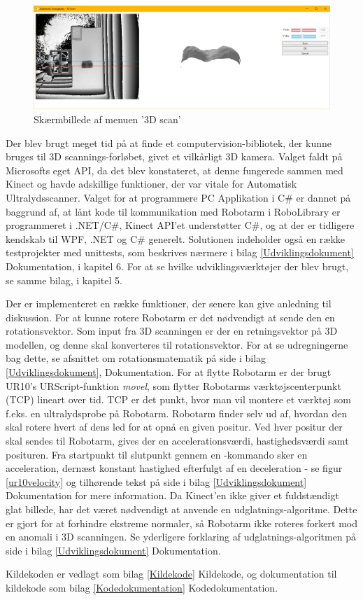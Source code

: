 \begin{figure}[H]
    \centering
    \includegraphics[width=1\textwidth]{figurer/d/GUIskitse/3d_scan}
    \caption{Skærmbillede af menuen '3D scan'}
    \label{screenshot_3dscan}
\end{figure}

Der blev brugt meget tid på at finde et computervision-bibliotek, der kunne bruges til 3D scannings-forløbet, givet et vilkårligt 3D kamera. Valget faldt på Microsofts eget API, da det blev konstateret, at denne fungerede sammen med Kinect og havde adskillige funktioner, der var vitale for Automatisk Ultralydsscanner. 
Valget for at programmere PC Applikation i C\# er dannet på baggrund af, at lånt kode til kommunikation med Robotarm i RoboLibrary er programmeret i .NET/C\#, Kinect API'et understøtter C\#, og at der er tidligere kendskab til WPF, .NET og C\# generelt. Solutionen indeholder også en række testprojekter med unittests, som beskrives nærmere i bilag \ref{Udviklingsdokument} Dokumentation, i kapitel 6. For at se hvilke udviklingsværktøjer der blev brugt, se samme bilag, i kapitel 5. 

Der er implementeret en række funktioner, der senere kan give anledning til diskussion. 
For at kunne rotere Robotarm er det nødvendigt at sende den en rotationsvektor. Som input fra 3D scanningen er der en retningsvektor på 3D modellen, og denne skal konverteres til rotationsvektor. For at se udregningerne bag dette, se afsnittet om rotationsmatematik på side \pageref{rotationsmatematik} i bilag \ref{Udviklingsdokument}, Dokumentation.
\newline
For at flytte Robotarm er der brugt UR10's URScript-funktion \textit{movel}, som flytter Robotarms værktøjscenterpunkt (TCP) lineart over tid. TCP er det punkt, hvor man vil montere et værktøj som f.eks. en ultralydsprobe på Robotarm.  Robotarm finder selv ud af, hvordan den skal rotere hvert af dens led for at opnå en given positur. Ved hver positur der skal sendes til Robotarm, gives der en accelerationsværdi, hastighedsværdi samt posituren. Fra startpunkt til slutpunkt gennem en -kommando sker en acceleration, dernæst konstant hastighed efterfulgt af en deceleration - se figur \ref{ur10velocity} og tilhørende tekst på side \pageref{ur10velocity} i bilag \ref{Udviklingsdokument} Dokumentation for mere information.
\newline
Da Kinect'en ikke giver et fuldstændigt glat billede, har det været nødvendigt at anvende en udglatnings-algoritme. Dette er gjort for at forhindre ekstreme normaler, så Robotarm ikke roteres forkert mod en anomali i 3D scanningen. Se yderligere forklaring af udglatnings-algoritmen på side \pageref{calculationlibraryafsnit} i bilag \ref{Udviklingsdokument} Dokumentation.

Kildekoden er vedlagt som bilag \ref{Kildekode} Kildekode, og dokumentation til kildekode som bilag \ref{Kodedokumentation} Kodedokumentation.
